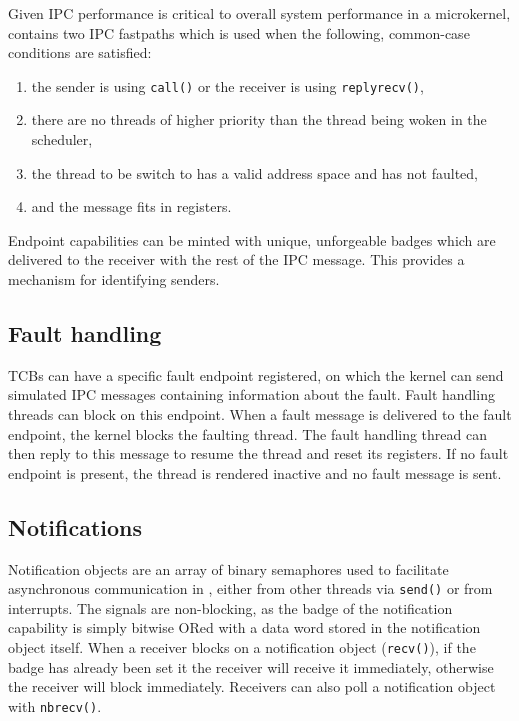 Given \gls{IPC} performance is critical to overall system performance in a microkernel, \selfour
contains two \gls{IPC} fastpaths which is used when the following, common-case conditions are satisfied:

\begin{enumerate}
    \item the sender is using \texttt{call()} or the receiver is using \texttt{replyrecv()},
    \item there are no threads of higher priority than the thread being woken in the scheduler,
    \item the thread to be switch to has a valid address space and has not faulted,
    \item and the message fits in registers.
\end{enumerate}

Endpoint capabilities can be minted with unique, unforgeable badges which are delivered to the
receiver with the rest of the IPC message. This provides a mechanism for identifying senders.

\subsection{Fault handling}

\glspl{TCB} can have a specific fault endpoint registered, on which the kernel can send simulated
\gls{IPC} messages containing information about the fault. Fault handling threads can block on this 
endpoint. When a fault message is delivered to the fault endpoint, the kernel blocks the faulting
thread. The fault handling thread can then reply to this message to resume the thread and reset its
registers. If no fault endpoint is present, the
thread is rendered inactive and no fault message is sent. 

\subsection{Notifications}

Notification objects are an array of binary semaphores used to facilitate asynchronous communication in \selfour, either from other threads via \texttt{send()} or from
interrupts.  The signals are non-blocking, as the badge of the notification capability is simply
bitwise ORed with a data word stored in the notification object itself. When a receiver blocks on a
notification object (\texttt{recv()}), if the badge has already been set it the receiver will
receive it immediately, otherwise the receiver will block immediately. Receivers can also poll a
notification object with \texttt{nbrecv()}.


